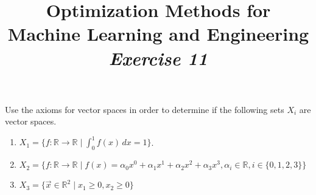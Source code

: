 



\author{}
\date{}
\title{Optimization Methods for \\Machine Learning and Engineering\\\vspace{0.5cm}\textit{Exercise 11}}
\maketitle


\setcounter{section}{11}
\setcounter{exercise}{0}




\begin{exercise}[subtitle={Paper}]
  Use the axioms for vector spaces in order to determine if the following sets $X_i$ are vector spaces.
\begin{enumerate}[label=\emph{\alph*)}]
  \item $X_1 = \{f: \mathbb{R} \to \mathbb{R}\; |\; \int_0^1 f(x)\, dx = 1 \}$.
  \item $X_2 = \{f: \mathbb{R} \to \mathbb{R} \; |\; f(x)= \alpha_0 x^0 + \alpha_1 x^1 + \alpha_2 x^2 + \alpha_3 x^3,\alpha_i \in \mathbb{R}, i \in \{0,1,2,3\}  \}$
\item $X_3 = \{\vec x \in \mathbb{R}^2 \mid x_1 \geq 0, x_2 \geq 0 \}$
  \end{enumerate}
\end{exercise}

